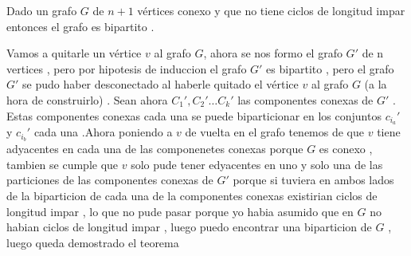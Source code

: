 \documentclass{article}
\begin{document}
	Dado un grafo $G$ de $n+1$ v\'ertices conexo y que no tiene ciclos de longitud impar entonces el grafo es bipartito . 
	
	Vamos a quitarle un v\'ertice $v$ al grafo $G$, ahora se nos formo el grafo $G'$ de n vertices , pero por hipotesis de induccion el grafo $G'$ es bipartito , pero el grafo $G'$ se pudo haber desconectado al haberle quitado el v\'ertice $v$ al grafo $G$ (a la hora de construirlo) . Sean ahora $C_1',C_2'\dots C_k'$ las componentes conexas de $G'$ . Estas componentes conexas cada una se puede biparticionar en los conjuntos $c_{i_a}'$ y $c_{i_b}' $ cada una .Ahora poniendo a $v$ de vuelta en el grafo tenemos de que $v$ tiene adyacentes en cada una de las componenetes conexas porque $G$ es conexo  , tambien se cumple que $v$ solo pude tener edyacentes en uno y solo una de las particiones de las componentes conexas de $G'$ porque si tuviera en ambos lados de la biparticion de cada una de la componentes conexas existirian ciclos de longitud impar , lo que no pude pasar porque yo habia asumido que en $G$ no habian ciclos de longitud impar , luego puedo encontrar una biparticion de $G$ , luego queda demostrado el teorema 
	
	 
	
	
	
\end{document}
